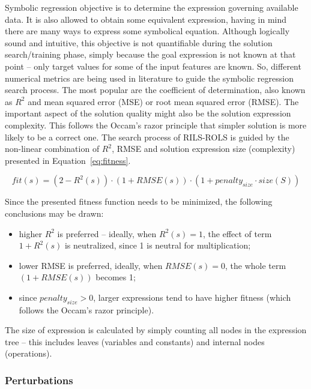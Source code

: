 \documentclass[a4paper,12pt]{elsarticle}
\begin{document}
Symbolic regression objective is to determine the expression governing available data. It is also allowed to obtain some equivalent expression, having in mind there are many ways to express some symbolical equation. Although logically sound and intuitive, this objective is not quantifiable during the solution search/training phase, simply because the goal expression is not known at that point -- only target values for some of the input features are known. So, different numerical metrics are being used in literature to guide the symbolic regression search process. The most popular are the coefficient of determination, also known as $R^2$ and mean squared error (MSE) or root mean squared error (RMSE). The important aspect of the solution quality might also be the solution expression complexity. This follows the Occam's razor principle that simpler solution is more likely to be a correct one. 
The search process of RILS-ROLS is guided by the non-linear combination of $R^2$, RMSE and solution expression size (complexity) presented in Equation~\ref{eq:fitness}. 

\begin{equation}
	\label{eq:fitness}
	fit(s) = (2-R^2(s)) \cdot (1+RMSE(s)) \cdot (1+penalty_{size} \cdot size(S))
\end{equation}

Since the presented fitness function needs to be minimized, the following conclusions may be drawn:
\begin{itemize}
	\item higher $R^2$ is preferred -- ideally, when $R^2(s)=1$, the effect of term $1+R^2(s)$ is neutralized, since 1 is neutral for multiplication;
	\item lower RMSE is preferred, ideally, when $RMSE(s)=0$, the whole term $(1+RMSE(s))$ becomes 1;
	\item since $penalty_{size} > 0$, larger expressions tend to have higher fitness (which follows the Occam's razor principle).
\end{itemize}

The size of expression is calculated by simply counting all nodes in the expression tree -- this includes leaves (variables and constants) and internal nodes (operations). 

\subsubsection{Perturbations}\label{sec:pertGen}
\end{document}
